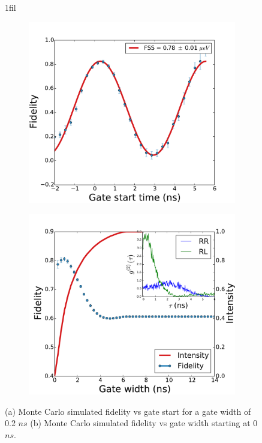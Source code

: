 \documentclass[12pt, twoside]{article}
\makeatletter
\numberwithin{equation}{section}
\newcommand*{\centerfloat}{%
  \parindent \z@
  \leftskip \z@ \@plus 1fil \@minus \textwidth
  \rightskip\leftskip
  \parfillskip \z@skip}
\makeatother
\begin{document}
\begin{figure}
\centerfloat
\begin{subfigure}{.5\textwidth}
  \centering
  \includegraphics[width=1\linewidth]{images/fidelity_gatestart.pdf}
  \caption{}
  \label{fig:sub1}
\end{subfigure}%
\begin{subfigure}{.5\textwidth}
  \centering
  \includegraphics[width=1\linewidth]{images/fidelity_gatewidth.pdf}
  \caption{}
  \label{fig:decaypath}
\end{subfigure}
\caption{(a) Monte Carlo simulated fidelity vs gate start for a gate width of 0.2 $ns$ (b) Monte Carlo simulated fidelity vs gate width starting at 0 $ns$.}
\label{fig:timegatesim}
\end{figure}
\end{document}
